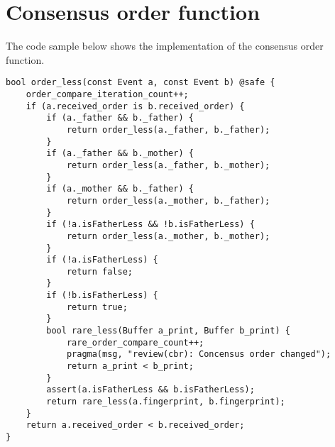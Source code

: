 \section{Consensus order function}\label{sec:order_function}
The code sample below shows the implementation of the consensus order function.
\lstset{language=c++, numbers=left, numberstyle=\tiny, stepnumber=1, numbersep=5pt, tabsize=4}%
\begin{lstlisting}
bool order_less(const Event a, const Event b) @safe {
	order_compare_iteration_count++;
	if (a.received_order is b.received_order) {
		if (a._father && b._father) {
			return order_less(a._father, b._father);
		}
		if (a._father && b._mother) {
			return order_less(a._father, b._mother);
		}
		if (a._mother && b._father) {
			return order_less(a._mother, b._father);
		}
		if (!a.isFatherLess && !b.isFatherLess) {
			return order_less(a._mother, b._mother);
		}
		if (!a.isFatherLess) {
			return false;
		}
		if (!b.isFatherLess) {
			return true;
		}
		bool rare_less(Buffer a_print, Buffer b_print) {
			rare_order_compare_count++;
			pragma(msg, "review(cbr): Concensus order changed");
			return a_print < b_print;
		}
		assert(a.isFatherLess && b.isFatherLess);
		return rare_less(a.fingerprint, b.fingerprint);
	}
	return a.received_order < b.received_order;
}
\end{lstlisting}
